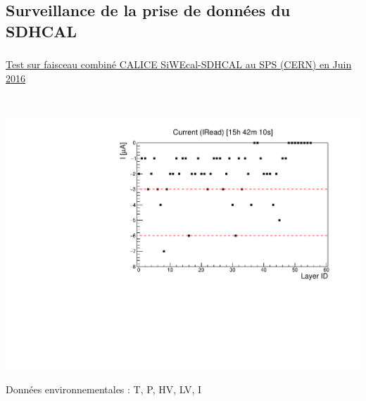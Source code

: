 \documentclass[8pt]{beamer}
\begin{document}
    \subsection{Surveillance de la prise de données du SDHCAL}

    \begin{frame}
    \frametitle{\secname}
    \framesubtitle{\subsecname}
    \small
    \begin{center} \underline{Test sur faisceau combiné CALICE SiWEcal-SDHCAL au SPS (CERN) en Juin 2016} \end{center}
    ~\\

      \begin{minipage}{0.48\linewidth}
        \centering \includegraphics[width=0.6\linewidth]{DQM_SDHCAL_Current_SC13.pdf}
        \begin{center} Données environnementales : T, P, HV, LV, I \end{center}

\end{minipage}
\end{frame}
\end{document}

